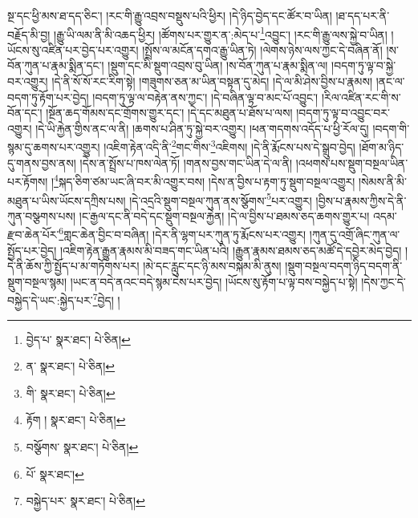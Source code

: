 སྔ་དང་ཕྱི་མས་ཐ་དད་ཅིང་། །རང་གི་རྒྱུ་འབྲས་བསྡུས་པའི་ཕྱིར། །དེ་ཉིད་བྱེད་དང་ཚོར་བ་ཡིན། །ཐ་དད་པར་ནི་བརྗོད་མི་བྱ། །རྒྱུ་ཡི་ལམ་ནི་མི་འཆད་ཕྱིར། །ཚོགས་པར་གྱུར་ན་:མེད་པ་\footnote{བྱེད་པ་  སྣར་ཐང་།  པེ་ཅིན། }འབྱུང་། །རང་གི་རྒྱུ་ལས་སྐྱེ་བ་ཡིན། །ཡོངས་སུ་འཛིན་པར་བྱེད་པར་འགྱུར། །སྤྲོས་ལ་མངོན་དགའ་རྒྱུ་ཡིན་ཏེ། །ལེགས་ཉེས་ལས་ཀྱང་དེ་བཞིན་ནོ། །ས་བོན་ཀུན་པ་རྣམ་སྨིན་དང་། །སྡུག་དང་མི་སྡུག་འབྲས་བུ་ཡིན། །ས་བོན་ཀུན་པ་རྣམ་སྨིན་ལ། །བདག་ཏུ་ལྟ་བ་སྐྱེ་བར་འགྱུར། །དེ་ནི་སོ་སོ་རང་རིག་སྟེ། །གཟུགས་ཅན་མ་ཡིན་བསྟན་དུ་མེད། །དེ་ལ་མི་ཤེས་བྱིས་པ་རྣམས། །ནང་ལ་བདག་ཏུ་རྟོག་པར་བྱེད། །བདག་ཏུ་ལྟ་ལ་བརྟེན་ནས་ཀྱང་། །དེ་བཞིན་ལྟ་བ་མང་པོ་འབྱུང་། །རིལ་འཛིན་རང་གི་ས་བོན་དང་། །སྔོན་ཆད་གོམས་དང་གྲོགས་གྱུར་དང་། །དེ་དང་མཐུན་པ་ཐོས་པ་ལས། །བདག་ཏུ་ལྟ་བ་འབྱུང་བར་འགྱུར། །དེ་ཡི་རྐྱེན་གྱིས་ནང་ལ་ནི། །ཆགས་པ་ཤིན་ཏུ་སྐྱེ་བར་འགྱུར། །ཕན་གདགས་འདོད་པ་ཕྱི་རོལ་དུ། །བདག་གི་སྙམ་དུ་ཆགས་པར་འགྱུར། །འཇིག་རྟེན་འདི་ནི་\footnote{ན་  སྣར་ཐང་།  པེ་ཅིན། }གང་གིས་\footnote{གི་  སྣར་ཐང་།  པེ་ཅིན། }འཇིགས། །དེ་ནི་རྨོངས་པས་དེ་སྒྲུབ་བྱེད། །ཐོག་མ་ཉིད་དུ་གནས་བྱས་ནས། །དེས་ན་སྤྲོས་པ་ཁས་ལེན་ཏོ། །གནས་བྱས་གང་ཡིན་དེ་ལ་ནི། །འཕགས་པས་སྡུག་བསྔལ་ཡིན་པར་རྟོགས། །\footnote{རྟོག །  སྣར་ཐང་།  པེ་ཅིན། }སྐད་ཅིག་ཙམ་ཡང་ཞི་བར་མི་འགྱུར་བས། །དེས་ན་བྱིས་པ་རྟག་ཏུ་སྡུག་བསྔལ་འགྱུར། །སེམས་ནི་མི་མཐུན་པ་ཡིས་ཡོངས་དཀྲིས་པས། །དེ་འདྲའི་སྡུག་བསྔལ་ཀུན་ནས་སྩོགས་\footnote{བསྩོགས་  སྣར་ཐང་།  པེ་ཅིན། }པར་འགྱུར། །བྱིས་པ་རྣམས་ཀྱིས་དེ་ནི་ཀུན་བསྩགས་པས། །ང་རྒྱལ་དང་ནི་བདེ་དང་སྡུག་བསྔལ་རྐྱེན། །དེ་ལ་བྱིས་པ་ཐམས་ཅད་ཆགས་གྱུར་པ། འདམ་རྫབ་ཆེན་པོར་\footnote{པོ་  སྣར་ཐང་། }གླང་ཆེན་བྱིང་བ་བཞིན། །དེར་ནི་ལྷག་པར་ཀུན་ཏུ་རྨོངས་པར་འགྱུར། །ཀུན་དུ་འགྲོ་ཞིང་ཀུན་ལ་སྤྱོད་པར་བྱེད། །འཇིག་རྟེན་རྒྱུན་རྣམས་མི་བཟད་གང་ཡིན་པའི། །རྒྱུན་རྣམས་ཐམས་ཅད་མཚོ་དེ་དབྱེར་མེད་བྱེད། །དེ་ནི་ཆོས་ཀྱི་སྤྱོད་པ་མ་གཏོགས་པར། །མེ་དང་རླུང་དང་ཉི་མས་བསྐམ་མི་ནུས། །སྡུག་བསྔལ་བདག་ཉིད་བདག་ནི་སྡུག་བསྔལ་སྙམ། །ཡང་ན་བདེ་ནའང་བདེ་སྙམ་ངེས་པར་བྱེད། །ཡོངས་སུ་རྟོག་པ་ལྟ་བས་བསྐྱེད་པ་སྟེ། །དེས་ཀྱང་དེ་བསྐྱེད་དེ་ཡང་:སྐྱེད་པར་\footnote{བསྐྱེད་པར་  སྣར་ཐང་།  པེ་ཅིན། }བྱེད། །
